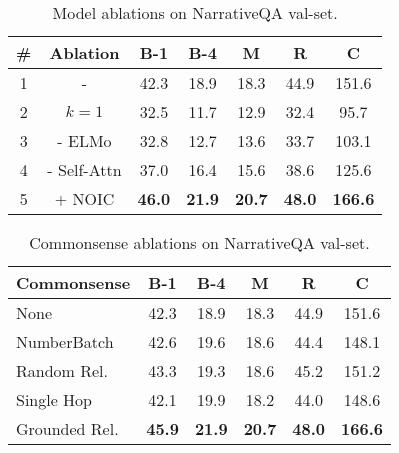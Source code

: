 \documentclass[11pt,a4paper]{article}
\newcommand{\fullModel}{NOIC}
\begin{document}
\begin{table}
	\centering
    \begin{small}
    \begin{tabular}{ccccccc}\toprule
    \textbf{\#} & \textbf{Ablation} & \textbf{B-1} & \textbf{B-4} & \textbf{M} & \textbf{R} & \textbf{C}\\
    \midrule
    1 & - & 42.3 & 18.9 & 18.3 & 44.9 & 151.6 \\
    2 & $k=1$ & 32.5 & 11.7 & 12.9 & 32.4 & 95.7 \\
    3 & - ELMo & 32.8 & 12.7 & 13.6 &  33.7 & 103.1 \\
    4 & - Self-Attn & 37.0 & 16.4 & 15.6 & 38.6 & 125.6 \\
    5 & + \fullModel & \bf 46.0 & \bf 21.9 & \bf 20.7 & \bf 48.0 & \bf 166.6 \\
    \bottomrule
    \end{tabular}
    \end{small}
    \caption{Model ablations on NarrativeQA val-set.}
    \label{tab:model_ablations}
\end{table}
 \begin{table}
	\centering
    \begin{small}
    \begin{tabular}{lccccc}\toprule
    \textbf{Commonsense} & \textbf{B-1} & \textbf{B-4} & \textbf{M} & \textbf{R} & \textbf{C} \\
    \midrule
    None & 42.3 & 18.9 & 18.3 & 44.9 & 151.6 \\
    NumberBatch & 42.6 & 19.6 & 18.6 & 44.4 & 148.1 \\
    Random Rel. & 43.3 & 19.3 & 18.6 & 45.2 & 151.2 \\
    Single Hop & 42.1 & 19.9 & 18.2 & 44.0 & 148.6 \\
    Grounded Rel. & \bf 45.9 & \bf 21.9 & \bf 20.7 & \bf 48.0 & \bf 166.6\\
    \bottomrule
    \end{tabular}
    \end{small}
    \vspace{-5pt}
    \caption{Commonsense ablations on NarrativeQA val-set.}
    \label{tab:commonsense_abl_exps}
    \vspace{-10pt}
\end{table}
\end{document}
